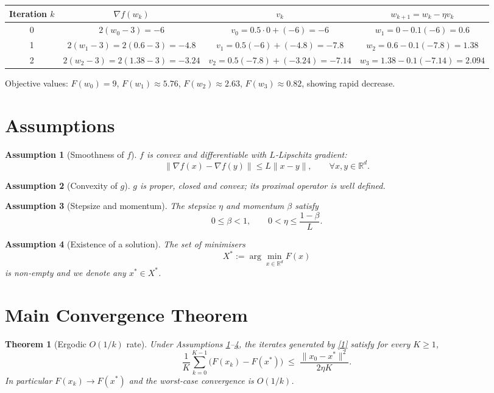 \documentclass{article}
\newtheorem{theorem}{Theorem}
\newtheorem{assumption}{Assumption}
\newcommand{\R}{\mathbb{R}}
\begin{document}
\begin{center}
\begin{tabular}{c|c|c|c}
Iteration $k$ & $\nabla f(w_{k})$ & $v_{k}$ & $w_{k+1}=w_{k}-\eta v_{k}$ \\ \hline
0 & $2(w_{0}-3)=-6$ & $v_{0}=0.5\cdot0+(-6)=-6$ & $w_{1}=0-0.1(-6)=0.6$ \\[4pt]
1 & $2(w_{1}-3)=2(0.6-3)=-4.8$ & $v_{1}=0.5(-6)+(-4.8)=-7.8$ & $w_{2}=0.6-0.1(-7.8)=1.38$ \\[4pt]
2 & $2(w_{2}-3)=2(1.38-3)=-3.24$ & $v_{2}=0.5(-7.8)+(-3.24)=-7.14$ & $w_{3}=1.38-0.1(-7.14)=2.094$ 
\end{tabular}
\end{center}
Objective values: $F(w_{0})=9$, $F(w_{1})\approx5.76$, $F(w_{2})\approx2.63$, $F(w_{3})\approx0.82$,
showing rapid decrease.

\newpage
\section*{Assumptions}
\begin{assumption}[Smoothness of $f$]\label{ass:smooth}
$f$ is convex and differentiable with $L$‑Lipschitz gradient:
\[
\|\nabla f(x)-\nabla f(y)\|\le L\|x-y\|,\qquad \forall x,y\in\R^{d}.
\tag{A1}
\]
\end{assumption}
\begin{assumption}[Convexity of $g$]\label{ass:convex}
$g$ is proper, closed and convex; its proximal operator is well defined.
\end{assumption}
\begin{assumption}[Stepsize and momentum]\label{ass:param}
The stepsize $\eta$ and momentum $\beta$ satisfy
\[
0\le\beta<1,\qquad 0<\eta\le\frac{1-\beta}{L}.
\tag{A3}
\]
\end{assumption}
\begin{assumption}[Existence of a solution]\label{ass:opt}
The set of minimisers 
\[
X^{*}:=\arg\min_{x\in\R^{d}}F(x)
\]
is non‑empty and we denote any $x^{*}\in X^{*}$.
\end{assumption}

\section*{Main Convergence Theorem}
\begin{theorem}[Ergodic $O(1/k)$ rate]\label{thm:rate}
Under Assumptions \ref{ass:smooth}–\ref{ass:opt}, the iterates generated by \eqref{1} satisfy for every $K\ge1$,
\[
\frac{1}{K}\sum_{k=0}^{K-1}\bigl(F(x_{k})-F(x^{*})\bigr)
\;\le\;
\frac{\|x_{0}-x^{*}\|^{2}}{2\eta K}.
\tag{2}
\]
In particular $F(x_{k})\to F(x^{*})$ and the worst‑case convergence is $O(1/k)$.
\end{theorem}
\end{document}
